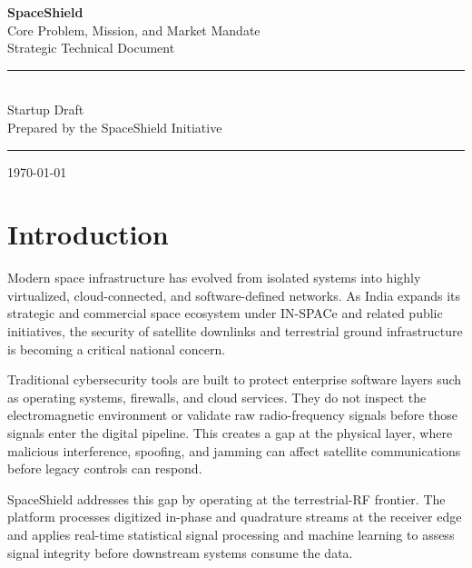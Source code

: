 \documentclass[11pt,a4paper]{article}
\begin{document}
\begin{titlepage}
    \centering
    \vspace*{1.5cm}
    
    {\LARGE \textbf{SpaceShield}}\\[0.4cm]
    {\Large Core Problem, Mission, and Market Mandate}\\[0.2cm]
    {\large Strategic Technical Document}\\[1.0cm]
    
    
    \rule{0.8\textwidth}{0.5pt}\\[0.5cm]
    {\large Startup Draft}\\[0.2cm]
    {\normalsize Prepared by the SpaceShield Initiative}\\
    \rule{0.8\textwidth}{0.5pt}
    
    \vfill
    {\normalsize \today}
\end{titlepage}

\tableofcontents
\newpage

\section{Introduction}

Modern space infrastructure has evolved from isolated systems into highly virtualized, cloud-connected, and software-defined networks. As India expands its strategic and commercial space ecosystem under IN-SPACe and related public initiatives, the security of satellite downlinks and terrestrial ground infrastructure is becoming a critical national concern.

Traditional cybersecurity tools are built to protect enterprise software layers such as operating systems, firewalls, and cloud services. They do not inspect the electromagnetic environment or validate raw radio-frequency signals before those signals enter the digital pipeline. This creates a gap at the physical layer, where malicious interference, spoofing, and jamming can affect satellite communications before legacy controls can respond.

SpaceShield addresses this gap by operating at the terrestrial-RF frontier. The platform processes digitized in-phase and quadrature streams at the receiver edge and applies real-time statistical signal processing and machine learning to assess signal integrity before downstream systems consume the data.

\end{document}
